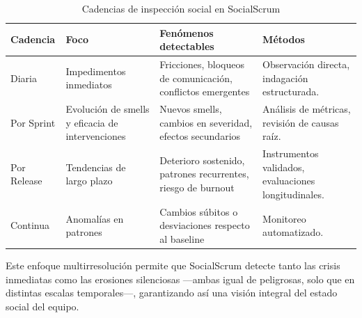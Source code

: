 \begin{table}[htb]
    \caption{Cadencias de inspección social en SocialScrum}
    \label{tab:inspeccion_cadencias}
    \centering
    \small
    \begin{tabular}{@{}p{2cm}p{3.5cm}p{4.5cm}p{3.5cm}@{}}
        \toprule
        \textbf{Cadencia}                                            & \textbf{Foco} & \textbf{Fenómenos detectables} & \textbf{Métodos} \\
        \midrule
        Diaria                                                       &
        Impedimentos inmediatos                                      &
        Fricciones, bloqueos de comunicación, conflictos emergentes  &
        Observación directa, indagación estructurada.                                                                                    \\
        \addlinespace
        Por Sprint                                                   &
        Evolución de smells y eficacia de intervenciones             &
        Nuevos smells, cambios en severidad, efectos secundarios     &
        Análisis de métricas, revisión de causas raíz.                                                                                   \\
        \addlinespace

        Por Release                                                  &
        Tendencias de largo plazo                                    &
        Deterioro sostenido, patrones recurrentes, riesgo de burnout &
        Instrumentos validados, evaluaciones longitudinales.                                                                             \\
        \addlinespace

        Continua                                                     &
        Anomalías en patrones                                        &
        Cambios súbitos o desviaciones respecto al baseline          &
        Monitoreo automatizado.                                                                                                          \\
        \bottomrule
    \end{tabular}
\end{table}

Este enfoque multirresolución permite que SocialScrum detecte tanto las crisis inmediatas como las erosiones silenciosas —ambas igual de peligrosas, solo que en distintas escalas temporales—, garantizando así una visión integral del estado social del equipo.

